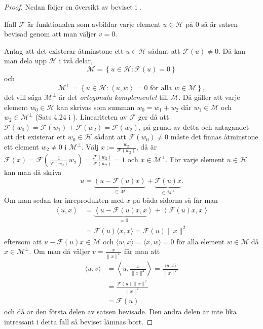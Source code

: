 \documentclass[a4paper, 12pt]{report}
\theoremstyle{definition}
\theoremstyle{remark}
\begin{document}
\begin{proof}
	Nedan följer en översikt av beviset i \cite{Young}.
	
	Ifall $\mathcal{F}$ är funktionalen som avbildar varje element $u\in\mathcal{H}$ på 0 så är satsen bevisad genom att man väljer $v=0$. 
	
	Antag att det existerar åtminstone ett $u\in\mathcal{H}$ sådant att $\mathcal{F}(u)\neq0$. Då kan man dela upp $\mathcal{H}$ i två delar,
	\begin{equation*}
		\mathcal{M} = \left\{u\in\mathcal{H}:\mathcal{F}\left(u\right)=0\right\}
	\end{equation*}
	och
	\begin{equation*}
		\mathcal{M}^\perp = \left\{u\in\mathcal{H}: \left\langle u,w \right\rangle=0\text{ för alla }w \in \mathcal{M}\right\},
	\end{equation*}
	det vill säga $\mathcal{M}^\perp$ är det \emph{ortogonala komplementet} till $\mathcal{M}$.
	Då gäller att varje element $w_0\in \mathcal{H}$ kan skrivas som summan $w_0 = w_1 + w_2$ där $w_1\in\mathcal{M}$ och $w_2\in \mathcal{M}^\perp$ (Sats 4.24 i \cite{Young}). Lineariteten av $\mathcal{F}$ ger då att $\mathcal{F}(w_0)=\mathcal{F}(w_1)+\mathcal{F}(w_2)=\mathcal{F}(w_2)$, på grund av detta och antagandet att det existerar ett $w_0\in\mathcal{H}$ sådant att $\mathcal{F}(w_0)\neq0$ måste det finnas åtminstone ett element $w_2 \neq 0$ i $\mathcal{M}^\perp$. Välj $x:= \frac{w_2}{\mathcal{F}(w_2)}$, då är $\mathcal{F}(x)=\mathcal{F}\left(\frac{1}{\mathcal{F}(w_2)}w_2\right)=\frac{\mathcal{F}(w_2)}{\mathcal{F}(w_2)}=1$ och $x\in\mathcal{M}^\perp$.
	För varje element $u\in\mathcal{H}$ kan man då skriva
	\begin{equation*}
		u=\underbrace{\left(u-\mathcal{F}(u)x \right)}_{\in\mathcal{M}} + \underbrace{\mathcal{F}(u)x}_{\in \mathcal{M}^\perp}.
	\end{equation*}
	Om man sedan tar inreprodukten med $x$ på båda sidorna så får man
	\begin{align*}
		\left\langle u,x \right\rangle &= \underbrace{\left\langle u-\mathcal{F}(u)x ,x \right\rangle}_{=0} + \left\langle \mathcal{F}(u)x,x \right\rangle\\
		&= \mathcal{F}(u)\langle x, x\rangle=\mathcal{F}(u)\|x\|^2
	\end{align*}
	eftersom att $u-\mathcal{F}(u)x\in\mathcal{M}$ och $\langle w, x \rangle=\langle x,w\rangle=0$ för alla element $w\in \mathcal{M}$ då $x\in\mathcal{M}^\perp$. Om man då väljer $v=\frac{x}{\|x\|^2}$ får man att
	\begin{align*}
		\langle u,v \rangle &= \left\langle u , \frac{x}{\|x\|^2}\right\rangle= \frac{\langle u, x\rangle}{\|x\|^2}\\
		&= \frac{\mathcal{F}(u)\|x\|^2}{\|x\|^2}\\
		&= \mathcal{F}(u)
	\end{align*}
	och då är den första delen av satsen bevisade. Den andra delen är inte lika intressant i detta fall så beviset lämnas bort.
\end{proof}
\end{document}
